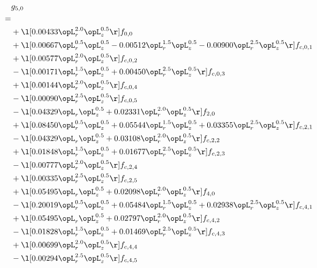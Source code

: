 \begin{alignat}{2} 
\label{eq:g_50_0} 
& g_{5,0} \nonumber \\ 
 = \\ 
& + \l[  0.00433 \opL_r^{2.0} \opL_z^{0.5}  \r] f_{0,0} \nonumber \\ 
& + \l[  0.00667 \opL_r^{0.5} \opL_z^{0.5}   -0.00512 \opL_r^{1.5} \opL_z^{0.5}   -0.00900 \opL_r^{2.5} \opL_z^{0.5}  \r] f_{c,0,1} \nonumber \\ 
& + \l[  0.00577 \opL_r^{2.0} \opL_z^{0.5}  \r] f_{c,0,2} \nonumber \\ 
& - \l[  0.00171 \opL_r^{1.5} \opL_z^{0.5} +  0.00450 \opL_r^{2.5} \opL_z^{0.5}  \r] f_{c,0,3} \nonumber \\ 
& + \l[  0.00144 \opL_r^{2.0} \opL_z^{0.5}  \r] f_{c,0,4} \nonumber \\ 
& - \l[  0.00090 \opL_r^{2.5} \opL_z^{0.5}  \r] f_{c,0,5} \nonumber \\ 
& - \l[  0.04329 \opL_r \opL_z^{0.5} +  0.02331 \opL_r^{2.0} \opL_z^{0.5}  \r] f_{2,0} \nonumber \\ 
& + \l[  0.08450 \opL_r^{0.5} \opL_z^{0.5} +  0.05544 \opL_r^{1.5} \opL_z^{0.5} +  0.03355 \opL_r^{2.5} \opL_z^{0.5}  \r] f_{c,2,1} \nonumber \\ 
& - \l[  0.04329 \opL_r \opL_z^{0.5} +  0.03108 \opL_r^{2.0} \opL_z^{0.5}  \r] f_{c,2,2} \nonumber \\ 
& + \l[  0.01848 \opL_r^{1.5} \opL_z^{0.5} +  0.01677 \opL_r^{2.5} \opL_z^{0.5}  \r] f_{c,2,3} \nonumber \\ 
& - \l[  0.00777 \opL_r^{2.0} \opL_z^{0.5}  \r] f_{c,2,4} \nonumber \\ 
& + \l[  0.00335 \opL_r^{2.5} \opL_z^{0.5}  \r] f_{c,2,5} \nonumber \\ 
& + \l[  0.05495 \opL_r \opL_z^{0.5} +  0.02098 \opL_r^{2.0} \opL_z^{0.5}  \r] f_{4,0} \nonumber \\ 
& - \l[  0.20019 \opL_r^{0.5} \opL_z^{0.5} +  0.05484 \opL_r^{1.5} \opL_z^{0.5} +  0.02938 \opL_r^{2.5} \opL_z^{0.5}  \r] f_{c,4,1} \nonumber \\ 
& + \l[  0.05495 \opL_r \opL_z^{0.5} +  0.02797 \opL_r^{2.0} \opL_z^{0.5}  \r] f_{c,4,2} \nonumber \\ 
& - \l[  0.01828 \opL_r^{1.5} \opL_z^{0.5} +  0.01469 \opL_r^{2.5} \opL_z^{0.5}  \r] f_{c,4,3} \nonumber \\ 
& + \l[  0.00699 \opL_r^{2.0} \opL_z^{0.5}  \r] f_{c,4,4} \nonumber \\ 
& - \l[  0.00294 \opL_r^{2.5} \opL_z^{0.5}  \r] f_{c,4,5} \nonumber \\ 
\end{alignat} 


